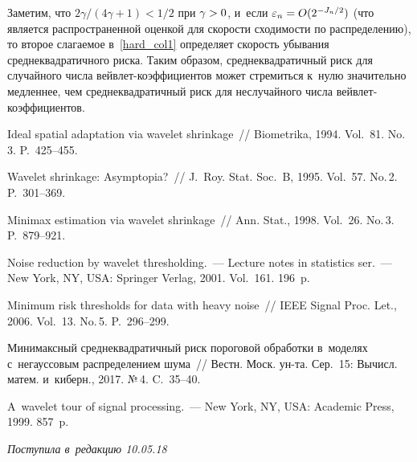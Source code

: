 \begin{multicols}{2}
Заметим, что ${2\gamma}/({4\gamma+1})<{1}/{2}$ 
при $\gamma\hm>0$, и~если $\eps_n\hm=O(2^{-J_n/2})$ (что 
является распространенной оценкой для ско\-рости схо\-ди\-мости 
по распределению), то второе сла\-га\-емое в~\eqref{hard_col1} определяет 
ско\-рость убывания сред\-не\-квад\-ра\-тич\-но\-го рис\-ка. Таким образом, среднеквадратичный 
риск для случайного числа вейв\-лет-ко\-эф\-фи\-ци\-ен\-тов может стремиться к~нулю 
значительно медленнее, чем сред\-не\-квад\-ра\-тич\-ный риск для неслучайного чис\-ла 
вейв\-лет-ко\-эф\-фи\-ци\-ен\-тов.

\vspace*{-9pt}

{\small\frenchspacing
 {%
 \begin{thebibliography}{9}
 
Ideal spatial adaptation via wavelet shrinkage~// Biometrika, 1994. 
Vol.~81. No.\,3. P.~425--455.

Wavelet shrinkage: Asymptopia?~// J.~Roy. Stat. Soc.~B, 1995. 
Vol.~57. No.\,2. P.~301--369.

 Minimax estimation via wavelet shrinkage~// 
Ann. Stat., 1998. Vol.~26. No.\,3. P.~879--921.

 Noise reduction by wavelet thresholding.~--- Lecture notes in statistics
ser.~---
New York, NY, USA: Springer Verlag, 2001.  Vol.~161. 196~p.

 Minimum risk thresholds for data with heavy noise~// 
IEEE Signal Proc. Let., 2006. Vol.~13. No.\,5. P.~296--299.

 Минимаксный среднеквадратичный риск пороговой обработки 
в~моделях с~негауссовым распределением шума~// Вестн. Моск. ун-та. Сер.~15: 
Вычисл. матем. и~киберн., 2017. №\,4. C.~35--40.

 A~wavelet tour of signal processing.~--- New York, NY, USA:
Academic Press, 1999. 857~p.
 \end{thebibliography}

 }
 }

\end{multicols}

\vspace*{-6pt}

\hfill{\small\textit{Поступила в~редакцию 10.05.18}}

